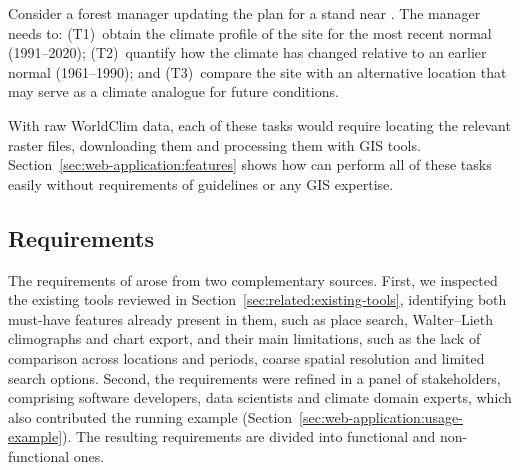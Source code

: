 Consider a forest manager updating the plan for a stand near \examplecity{}.
The manager needs to:
(T1)~obtain the climate profile of the site for the most recent normal (1991--2020);
(T2)~quantify how the climate has changed relative to an earlier normal (1961--1990); and
(T3)~compare the site with an alternative location that may serve as a climate analogue for future conditions.

With raw WorldClim data, each of these tasks would require locating the relevant
raster files, downloading them and processing them with GIS tools.
Section~\ref{sec:web-application:features} shows how \webappname{} can perform all of these tasks
easily without requirements of guidelines or any GIS expertise. 

\subsection{Requirements}\label{sec:web-application:requirements}
The requirements of \webappname{} arose from two complementary sources. First, we
inspected the existing tools reviewed in Section~\ref{sec:related:existing-tools},
identifying both must-have features already present in them, such as place search,
Walter--Lieth climographs and chart export, and their main limitations, such as the
lack of comparison across locations and periods, coarse spatial resolution and limited
search options. Second, the requirements were refined in a panel of stakeholders,
comprising software developers, data scientists and climate domain experts, which also
contributed the running example (Section~\ref{sec:web-application:usage-example}). The
resulting requirements are divided into functional and non-functional ones.

